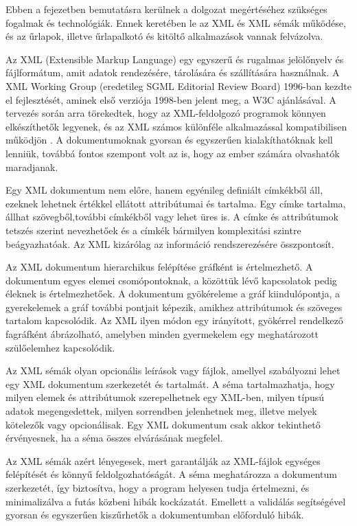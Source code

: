 
Ebben a fejezetben bemutatásra kerülnek a dolgozat megértéséhez szükséges fogalmak és technológiák. Ennek keretében le az XML és XML sémák működése, és az űrlapok, illetve űrlapalkotó és kitöltő alkalmazások vannak felvázolva.


Az XML (Extensible Markup Language) \cite{w3cxml} egy egyszerű és rugalmas jelölőnyelv és fájlformátum, amit adatok rendezésére, tárolására és szállítására használnak. A XML Working Group (eredetileg SGML Editorial Review Board) 1996-ban kezdte el fejlesztését, aminek első verziója 1998-ben jelent meg, a W3C ajánlásával. A tervezés során arra törekedtek, hogy az XML-feldolgozó programok könnyen elkészíthetők legyenek, és az XML számos különféle alkalmazással kompatibilisen működjön \cite{xml_article}. A dokumentumoknak gyorsan és egyszerűen kialakíthatóknak kell lenniük, továbbá fontos szempont volt az is, hogy az ember számára olvashatók maradjanak.

Egy XML dokumentum nem előre, hanem egyénileg definiált címkékből áll, ezeknek lehetnek értékkel ellátott attribútumai és tartalma. Egy címke tartalma, állhat szövegből,további címkékből vagy lehet üres is. A címke és attribútumok tetszés szerint nevezhetőek és a címkék bármilyen komplexitási szintre beágyazhatóak. Az XML kizárólag az információ rendszerezésére összpontosít.

Az XML dokumentum hierarchikus felépítése gráfként is értelmezhető. A dokumentum egyes elemei csomópontoknak, a közöttük lévő kapcsolatok pedig éleknek is értelmezhetőek. A dokumentum gyökéreleme a gráf kiindulópontja, a gyerekelemek a gráf további pontjait képezik, amikhez attribútumok és szöveges tartalom kapcsolódik. Az XML ilyen módon egy irányított, gyökérrel rendelkező fagráfként ábrázolható, amelyben minden gyermekelem egy meghatározott szülőelemhez kapcsolódik.


Az XML sémák olyan opcionális leírások vagy fájlok, amellyel szabályozni lehet egy XML dokumentum  szerkezetét és tartalmát. A séma tartalmazhatja, hogy milyen elemek és attribútumok szerepelhetnek egy XML-ben, milyen típusú adatok megengedettek, milyen sorrendben jelenhetnek meg, illetve melyek kötelezők vagy opcionálisak. Egy XML dokumentum csak akkor tekinthető érvényesnek, ha a séma összes elvárásának megfelel.

Az XML sémák azért lényegesek, mert garantálják az XML-fájlok egységes felépítését és könnyű feldolgozhatóságát. A séma meghatározza a dokumentum szerkezetét, így biztosítva, hogy a program helyesen tudja értelmezni, és minimalizálva a futás közbeni hibák kockázatát. Emellett a validálás segítségével gyorsan és egyszerűen kiszűrhetők a dokumentumban előforduló hibák.

